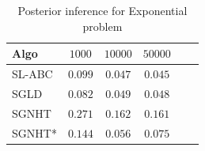 \documentclass[]{article}
\begin{document}
\begin{table}[h]
\caption{Posterior inference for Exponential problem}
\label{tab:exp-posterior}
\begin{center}
\begin{tabular}{|l||c|c|c|c|c}
  \hline 
Algo & $1000$ & $10000$ & $50000$ \\ \hline \hline 
SL-ABC & $0.099$ & $0.047$ & $0.045$ \\
SGLD & $0.082$ & $0.049$ & $0.048$ \\
SGNHT & $0.271$ & $0.162$ & $0.161$ \\
SGNHT* & $0.144$ & $0.056$ & $0.075$ \\ \hline 
\end{tabular}
\end{center}
\end{table}


% 
% 
\end{document}
